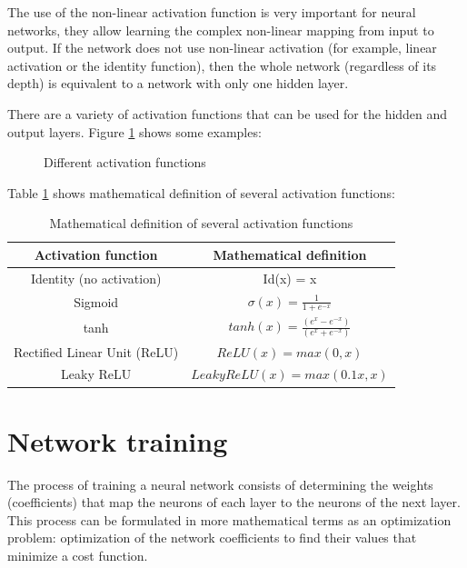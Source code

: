 The use of the non-linear activation function is very important for neural networks, they allow learning the complex non-linear mapping from input to output. If the network does not use non-linear activation (for example, linear activation or the identity function), then the whole network (regardless of its depth) is equivalent to a network with only one hidden layer.

There are a variety of activation functions that can be used for the hidden and output layers. Figure \ref{fig:activation-function} shows some examples:
\begin{figure}[h]
    \centering
	
    \caption{Different activation functions}
    \label{fig:activation-function}
\end{figure}

Table \ref{table:activation-functions} shows mathematical definition of several activation functions:

\begin{table}[h]
    \centering
    \begin{tabular}{c|c}
        \hline
        Activation function & Mathematical definition \\
        \hline
        Identity (no activation) & Id(x) = x \\
        Sigmoid & $\sigma(x)= \frac{1}{1+e^{-x}}$ \\
        tanh & $tanh(x)=\frac{(e^x-e^{-x})}{(e^x+e^{-x})}$\\
        Rectified Linear Unit (ReLU) & $ReLU(x)=max(0,x)$\\
        Leaky ReLU & $LeakyReLU(x)=max(0.1 x,x)$\\
    \hline
        
    \end{tabular}
    \caption{Mathematical definition of several activation functions}
    \label{table:activation-functions}
\end{table}


\section{Network training}
The process of training a neural network consists of determining the weights (coefficients) that map the neurons of each layer to the neurons of the next layer. This process can be formulated in more mathematical terms as an optimization problem: optimization of the network coefficients to find their values that minimize a cost function.

